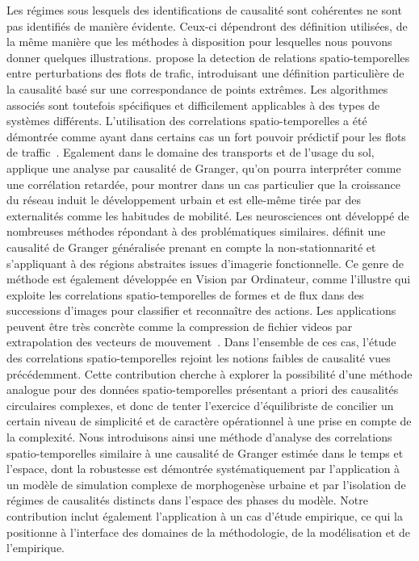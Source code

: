 {}{
Les régimes sous lesquels des identifications de causalité sont cohérentes ne sont pas identifiés de manière évidente. Ceux-ci dépendront des définition utilisées, de la même manière que les méthodes à disposition pour lesquelles nous pouvons donner quelques illustrations. \cite{liu2011discovering} propose la detection de relations spatio-temporelles entre perturbations des flots de trafic, introduisant une définition particulière de la causalité basé sur une correspondance de points extrêmes. Les algorithmes associés sont toutefois spécifiques et difficilement applicables à des types de systèmes différents. L'utilisation des correlations spatio-temporelles a été démontrée comme ayant dans certains cas un fort pouvoir prédictif pour les flots de traffic~\cite{min2011real}. Egalement dans le domaine des transports et de l'usage du sol, \cite{xie2009streetcars} applique une analyse par causalité de Granger, qu'on pourra interpréter comme une corrélation retardée, pour montrer dans un cas particulier que la croissance du réseau induit le développement urbain et est elle-même tirée par des externalités comme les habitudes de mobilité. Les neurosciences ont développé de nombreuses méthodes répondant à des problématiques similaires. \cite{luo2013spatio} définit une causalité de Granger généralisée prenant en compte la non-stationnarité et s'appliquant à des régions abstraites issues d'imagerie fonctionnelle. Ce genre de méthode est également développée en Vision par Ordinateur, comme l'illustre \cite{ke2007spatio} qui exploite les correlations spatio-temporelles de formes et de flux dans des successions d'images pour classifier et reconnaître des actions. Les applications peuvent être très concrète comme la compression de fichier videos par extrapolation des vecteurs de mouvement~\cite{chalidabhongse1997fast}. Dans l'ensemble de ces cas, l'étude des correlations spatio-temporelles rejoint les notions faibles de causalité vues précédemment. Cette contribution cherche à explorer la possibilité d'une méthode analogue pour des données spatio-temporelles présentant a priori des causalités circulaires complexes, et donc de tenter l'exercice d'équilibriste de concilier un certain niveau de simplicité et de caractère opérationnel à une prise en compte de la complexité. Nous introduisons ainsi une méthode d'analyse des correlations spatio-temporelles similaire à une causalité de Granger estimée dans le temps et l'espace, dont la robustesse est démontrée systématiquement par l'application à un modèle de simulation complexe de morphogenèse urbaine et par l'isolation de régimes de causalités distincts dans l'espace des phases du modèle. Notre contribution inclut également l'application à un cas d'étude empirique, ce qui la positionne à l'interface des domaines de la méthodologie, de la modélisation et de l'empirique.
}


